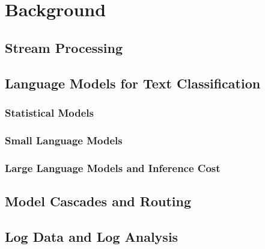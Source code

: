 \chapter{Background}\label{ch:background}

\section{Stream Processing}

\section{Language Models for Text Classification}
\subsection{Statistical Models}
\subsection{Small Language Models}
\subsection{Large Language Models and Inference Cost}

\section{Model Cascades and Routing}

\section{Log Data and Log Analysis}
